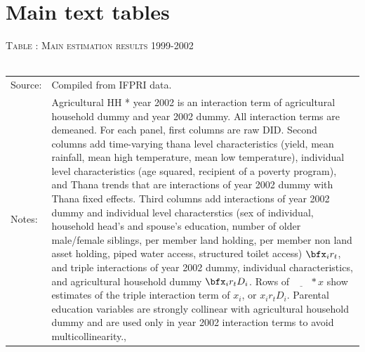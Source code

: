 \section{Main text tables}

\begin{table}[b]\hfil\textsc{\footnotesize Table \thetable: Main estimation results 1999-2002\label{zEm.1999.10.sameN}}\\\setlength{\tabcolsep}{.5pt}\renewcommand{\arraystretch}{.675}\hspace{-2em}\hfil\\\renewcommand{\arraystretch}{1}\hfil\begin{tabular}{>{\hfill\scriptsize}p{1cm}<{}>{\scriptsize}p{12cm}<{\hfill}} Source:& Compiled from IFPRI data. \\[-1ex] Notes:&   \textsf{Agricultural HH * year 2002} is an interaction term of agricultural household dummy and year 2002 dummy. All interaction terms are demeaned. For each panel, first columns are raw DID. Second columns add time-varying thana level characteristics (yield, mean rainfall, mean high temperature, mean low temperature), individual level characteristics (age squared, recipient of a poverty program), and \textsf{Thana trends} that are interactions of year 2002 dummy with Thana fixed effects. Third columns add interactions of year 2002 dummy and individual level characterstics (sex of individual, household head's and spouse's education, number of older male/female siblings, per member land holding, per member non land asset holding, piped water access, structured toilet access) $\bfx_{i}r_{t}$, and triple interactions of year 2002 dummy, individual characteristics, and agricultural household dummy $\bfx_{i}r_{t}D_{i}$. Rows of $\underline{\phantom{mm}}*x$ show estimates of the triple interaction term of $x_{i}$, or $x_{i}r_{t}D_{i}$. Parental education variables are strongly collinear with agricultural household dummy and are used only in year 2002 interaction terms to avoid multicollinearity., \\   \end{tabular} \end{table}


